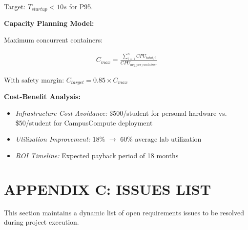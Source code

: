 \documentclass[12pt,a4paper]{article}
\begin{document}
Target: $T_{startup} < 10s$ for P95.

\textbf{Capacity Planning Model:}

Maximum concurrent containers:

\begin{align*}
C_{max} = \frac{\sum_{i=1}^{n} CPU_{total,i}}{CPU_{avg\_per\_container}}
\end{align*}

With safety margin: $C_{target} = 0.85 \times C_{max}$

\textbf{Cost-Benefit Analysis:}

\begin{itemize}
    \item \textit{Infrastructure Cost Avoidance:} \$500/student for personal hardware vs. \$50/student for CampusCompute deployment
    \item \textit{Utilization Improvement:} 18\% $\rightarrow$ 60\% average lab utilization
    \item \textit{ROI Timeline:} Expected payback period of 18 months
\end{itemize}

\newpage
\section*{APPENDIX C: ISSUES LIST}
\label{app:issues}

This section maintains a dynamic list of open requirements issues to be resolved during project execution.
\end{document}
